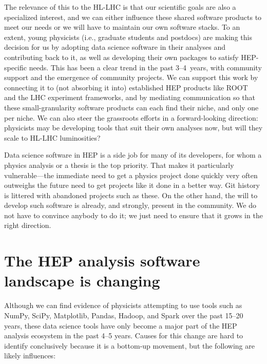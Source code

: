 \documentclass[12pt,a4paper]{article}
\begin{document}
The relevance of this to the HL-LHC is that our scientific goals are also a specialized interest, and we can either influence these shared software products to meet our needs or we will have to maintain our own software stacks. To an extent, young physicists (i.e., graduate students and postdocs) are making this decision for us by adopting data science software in their analyses and contributing back to it, as well as developing their own packages to satisfy HEP-specific needs. This has been a clear trend in the past 3--4~years, with community support and the emergence of community projects. We can support this work by connecting it to (not absorbing it into) established HEP products like ROOT~\cite{citeulike:363715} and the LHC experiment frameworks, and by mediating communication so that these small-granularity software products can each find their niche, and only one per niche. We can also steer the grassroots efforts in a forward-looking direction: physicists may be developing tools that suit their own analyses now, but will they scale to HL-LHC luminosities?

Data science software in HEP is a side job for many of its developers, for whom a physics analysis or a thesis is the top priority. That makes it particularly vulnerable---the immediate need to get a physics project done quickly very often outweighs the future need to get projects like it done in a better way. Git history is littered with abandoned projects such as these. On the other hand, the will to develop such software is already, and strongly, present in the community. We do not have to convince anybody to do it; we just need to ensure that it grows in the right direction.

\section{The HEP analysis software landscape is changing}

Although we can find evidence of physicists attempting to use tools such as NumPy, SciPy, Matplotlib, Pandas, Hadoop, and Spark over the past 15--20 years, these data science tools have only become a major part of the HEP analysis ecosystem in the past 4--5 years. Causes for this change are hard to identify conclusively because it is a bottom-up movement, but the following are likely influences:
\end{document}
